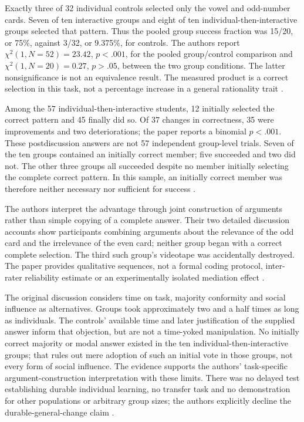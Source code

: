 Exactly three of 32 individual controls selected only the vowel and
odd-number cards. Seven of ten interactive groups and eight of ten
individual-then-interactive groups selected that pattern. Thus the pooled
group success fraction was 15/20, or 75\%, against 3/32, or 9.375\%,
for controls. The authors report \(\chi^2(1,N=52)=23.42\),
\(p<.001\), for the pooled group/control comparison and
\(\chi^2(1,N=20)=0.27\), \(p>.05\), between the two group
conditions. The latter nonsignificance is not an equivalence result.
The measured product is a correct selection in this task, not a percentage
increase in a general rationality trait
\cite[p.~235, Table~1]{MoshmanGeil1998CollaborativeReasoning}.

Among the 57 individual-then-interactive students, 12 initially selected
the correct pattern and 45 finally did so. Of 37 changes in correctness,
35 were improvements and two deteriorations; the paper reports a binomial
\(p<.001\). These postdiscussion answers are not 57 independent
group-level trials. Seven of the ten groups contained an initially correct
member; five succeeded and two did not. The other three groups all
succeeded despite no member initially selecting the complete correct
pattern. In this sample, an initially correct member was therefore neither
necessary nor sufficient for success
\cite[pp.~236--237, Table~2]{MoshmanGeil1998CollaborativeReasoning}.

The authors interpret the advantage through joint construction of
arguments rather than simple copying of a complete answer. Their two
detailed discussion accounts show participants combining arguments about
the relevance of the odd card and the irrelevance of the even card;
neither group began with a correct complete selection. The third such
group's videotape was accidentally destroyed. The paper provides qualitative
sequences, not a formal coding protocol, inter-rater reliability estimate
or an experimentally isolated mediation effect
\cite[pp.~237--245]{MoshmanGeil1998CollaborativeReasoning}.

The original discussion considers time on task, majority conformity and
social influence as alternatives. Groups took approximately two and a
half times as long as individuals. The controls' available time and later
justification of the supplied answer inform that objection, but are not
a time-yoked manipulation. No initially correct majority or modal answer
existed in the ten individual-then-interactive groups; that rules out
mere adoption of such an initial vote in those groups, not every form
of social influence. The evidence supports the authors' task-specific
argument-construction interpretation with these limits. There was no
delayed test establishing durable individual learning, no transfer task
and no demonstration for other populations or arbitrary group sizes;
the authors explicitly decline the durable-general-change claim
\cite[pp.~242--246]{MoshmanGeil1998CollaborativeReasoning}.

